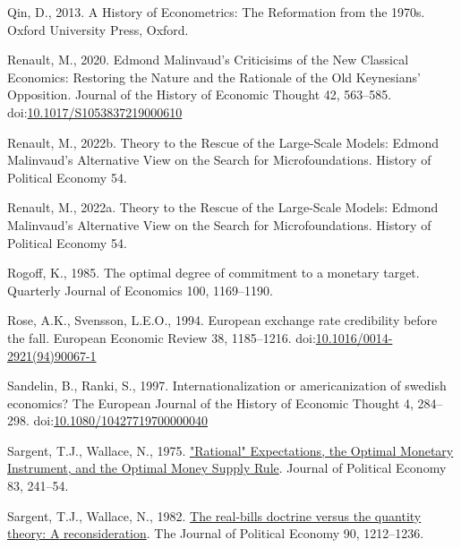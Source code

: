 \documentclass[
  12pt,
  onecolumn]{article}
\newlength{\cslhangindent}
\newlength{\cslentryspacingunit} %
\newenvironment{CSLReferences}[2] %
 {%
  \setlength{\parindent}{0pt}
  \ifodd #1
  \let\oldpar\par
  \def\par{\hangindent=\cslhangindent\oldpar}
  \fi
  \setlength{\parskip}{#2\cslentryspacingunit}
 }%
 {}
\begin{document}
\begin{CSLReferences}{1}{0}
\leavevmode{}%
Qin, D., 2013. {A History of Econometrics: The Reformation from the 1970s}. {Oxford University Press}, {Oxford}.

\leavevmode{}%
Renault, M., 2020. Edmond {Malinvaud}'s {Criticisims} of the {New Classical Economics}: {Restoring} the {Nature} and the {Rationale} of the {Old Keynesians}' {Opposition}. Journal of the History of Economic Thought 42, 563--585. doi:\href{https://doi.org/10.1017/S1053837219000610}{10.1017/S1053837219000610}

\leavevmode{}%
Renault, M., 2022b. Theory to the {Rescue} of the {Large-Scale Models}: {Edmond Malinvaud}'s {Alternative View} on the {Search} for {Microfoundations}. History of Political Economy 54.

\leavevmode{}%
Renault, M., 2022a. Theory to the {Rescue} of the {Large-Scale Models}: {Edmond Malinvaud}'s {Alternative View} on the {Search} for {Microfoundations}. History of Political Economy 54.

\leavevmode{}%
Rogoff, K., 1985. The optimal degree of commitment to a monetary target. Quarterly Journal of Economics 100, 1169--1190.

\leavevmode{}%
Rose, A.K., Svensson, L.E.O., 1994. European exchange rate credibility before the fall. European Economic Review 38, 1185--1216. doi:\href{https://doi.org/10.1016/0014-2921(94)90067-1}{10.1016/0014-2921(94)90067-1}

\leavevmode{}%
Sandelin, B., Ranki, S., 1997. Internationalization or americanization of swedish economics? The European Journal of the History of Economic Thought 4, 284--298. doi:\href{https://doi.org/10.1080/10427719700000040}{10.1080/10427719700000040}

\leavevmode{}%
Sargent, T.J., Wallace, N., 1975. \href{http://econpapers.repec.org/article/ucpjpolec/v_3A83_3Ay_3A1975_3Ai_3A2_3Ap_3A241-54.htm}{"{Rational}" {Expectations}, the {Optimal} {Monetary} {Instrument}, and the {Optimal} {Money} {Supply} {Rule}}. Journal of Political Economy 83, 241--54.

\leavevmode{}%
Sargent, T.J., Wallace, N., 1982. \href{http://www.jstor.org/stable/1830945}{The real-bills doctrine versus the quantity theory: {A} reconsideration}. The Journal of Political Economy 90, 1212--1236.


\end{CSLReferences}
\end{document}
